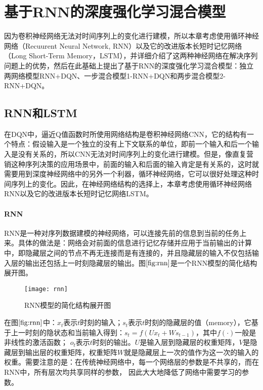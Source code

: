 \section{基于RNN的深度强化学习混合模型}
因为卷积神经网络无法对时间序列上的变化进行建模，所以本章考虑使用循环神经网络（Recuurent Neural Network, RNN）以及它的改进版本长短时记忆网络（Long  Short-Term Memory，LSTM），并详细介绍了这两种神经网络在解决序列问题上的优势，然后在此基础上提出了基于RNN的深度强化学习混合模型：独立两网络模型RNN+DQN、一步混合模型1-RNN+DQN和两步混合模型2-RNN+DQN。

\subsection{RNN和LSTM}
在DQN中，逼近Q值函数时所使用网络结构是卷积神经网络CNN，它的结构有一个特点：假设输入是一个独立的没有上下文联系的单位，即前一个输入和后一个输入是没有关系的，所以CNN无法对时间序列上的变化进行建模。但是，像直复营销这种序列决策的应用场景中，前面的输入和后面的输入肯定是有关系的，这时就需要用到深度神经网络中的另外一个利器，循环神经网络，它可以很好处理这种时间序列上的变化。因此，在神经网络结构的选择上，本章考虑使用循环神经网络RNN以及它的改进版本长短时记忆网络LSTM。

 \paragraph{RNN}
RNN是一种对序列数据建模的神经网络，可以连接先前的信息到当前的任务上来。具体的做法是：网络会对前面的信息进行记忆存储并应用于当前输出的计算中，即隐藏层之间的节点不再无连接而是有连接的，并且隐藏层的输入不仅包括输入层的输出还包括上一时刻隐藏层的输出。图$\ref{fig:rnn}$是一个RNN模型的简化结构展开图。
\begin{figure}[htbp]
\centering
\texttt{[image: rnn]}
\caption{RNN模型的简化结构展开图}
\label{fig:rnn}
\end{figure}

在图$\ref{fig:rnn}$中：$x_{t}$表示$t$时刻的输入；$s_{t}$表示$t$时刻的隐藏层的值（memory），它基于上一时刻的隐状态和当前输入得到：$s_t=f(U x_{t}+W s_{t−1})$，其中$f(\cdot)$一般是非线性的激活函数；
$o_{t}$表示$t$时刻的输出。$U$是输入层到隐藏层的权重矩阵，$V$是隐藏层到输出层的权重矩阵，权重矩阵$W$就是隐藏层上一次的值作为这一次的输入的权重。需要注意的是：在传统神经网络中，每一个网络层的参数是不共享的，而在RNN中，所有层次均共享同样的参数，
因此大大地降低了网络中需要学习的参数。

